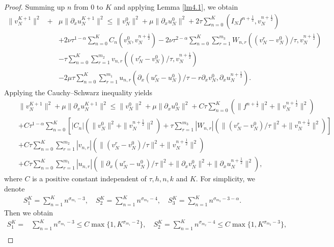 \documentclass[10pt]{siamltex}
\newcommand{\px}[1][x]{\partial_{#1}}
\newcommand{\mfrac}[1][2]{\frac{1}{2}}
\begin{document}
\begin{proof}
Summing up $n$ from 0 to $K$ and applying Lemma \ref{lm4.1}, we obtain
\begin{eqnarray}
\|v_N^{K+1}\|^2 &+&\mu\|\px[x]u_N^{K+1}\|^2\leq \|v_N^{0}\|^2 +\mu\|\px[x]u_N^{0}\|^2
+2\tau\sum_{n=0}^K(I_Nf^{n+\mfrac},v_N^{n+\mfrac})  \nonumber\\
&&+2{\nu}\tau^{1-\alpha}\sum_{n=0}^KC_n(v_N^{0},v_N^{n+\mfrac})
-2{\nu}\tau^{2-\alpha} \sum_{n=0}^K \sum_{r=1}^{m_3}W_{n,r}
\left((v_N^r-v_N^{0})/\tau,v_N^{n+\mfrac}\right)\nonumber \\
&&-\tau\sum_{n=0}^K\sum_{r=1}^{m_2}v_{n,r}\left((v_N^r-v_N^{0})/\tau,v_N^{n+\mfrac}\right)
\nonumber\\
&&-2\mu\tau\sum_{n=0}^K\sum_{r=1}^{m_1}u_{n,r}
\left(\px[x](u_N^r-u_N^{0})/\tau-r\px[x]v_N^{0},\px[x]u_N^{n+\mfrac}\right).\label{scheme2-1-4}
\end{eqnarray}
Applying the Cauchy--Schwarz inequality yields
\begin{eqnarray}
&&\|v_N^{K+1}\|^2 +\mu\|\px[x]u_N^{K+1}\|^2\leq \|v_N^{0}\|^2 +\mu\|\px[x]u_N^{0}\|^2
+C\tau\sum_{n=0}^K\left(\|f^{n+\mfrac}\|^2+\|v_N^{n+\mfrac}\|^2\right)\nonumber\\
&&+C\tau^{1-\alpha}\sum_{n=0}^K\left[|C_n|\left(\|v_N^{0}\|^2+\|v_N^{n+\mfrac}\|^2\right)
+ \tau  \sum_{r=1}^{m_3}|W_{n,r}|
\left(\|(v_N^r-v_N^{0})/\tau\|^2+\|v_N^{n+\mfrac}\|^2\right)\right]\nonumber\\
&&+C\tau\sum_{n=0}^K  \sum_{r=1}^{m_2}|v_{n,r}|
\left(\|(v_N^r-v_N^{0})/\tau\|^2+\|v_N^{n+\mfrac}\|^2\right)\nonumber\\
&&+C\tau\sum_{n=0}^K\sum_{r=1}^{m_1}|u_{n,r}|
\left(\|\px[x](u_N^r-u_N^{0})/\tau\|^2+\|\px[x]v_N^{0}\|^2+\|\px[x]u_N^{n+\mfrac}\|^2\right),\label{scheme2-1-6}
\end{eqnarray}
where $C$ is a positive constant independent of $\tau,h,n,k$ and $K$.
For simplicity, we denote
\begin{equation}\label{scheme2-1-6-2}\begin{aligned}
S_1^K=\sum_{n=1}^K n^{\sigma_{m_1}-3},{\quad}S_2^K = \sum_{n=1}^Kn^{\sigma_{m_2}-4},
{\quad} S_3^K= \sum_{n=1}^Kn^{\sigma_{m_3}-3-\alpha}.
\end{aligned}\end{equation}
Then we   obtain
\begin{equation}\label{scheme2-1-6-3}\begin{aligned}
S_1^K=&\sum_{n=1}^K n^{\sigma_{m_1}-3}\leq C\max\{1,K^{\sigma_{m_1}-2}\},
{\quad}S_2^K = \sum_{n=1}^Kn^{\sigma_{m_2}-4}\leq C\max\{1,K^{\sigma_{m_2}-3}\},\\

\end{aligned}
\end{equation}
\end{proof}
\end{document}
